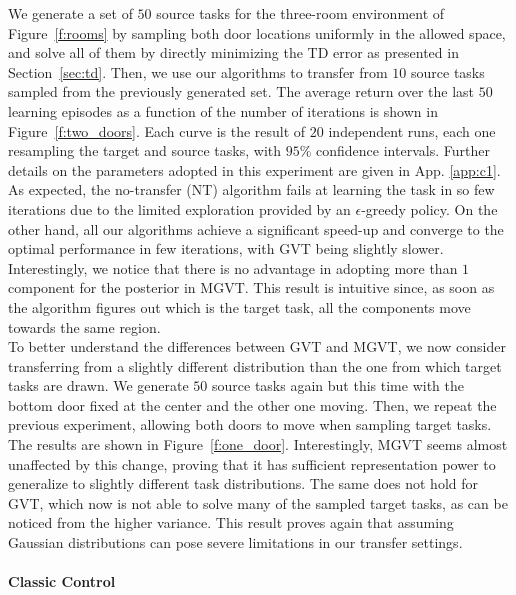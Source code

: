 \documentclass{article}
\begin{document}
We generate a set of $50$ source tasks for the three-room environment of Figure~\ref{f:rooms} by sampling both door locations uniformly in the allowed space, and solve all of them by directly minimizing the TD error as presented in Section~\ref{sec:td}. Then, we use our algorithms to transfer from $10$ source tasks sampled from the previously generated set. The average return over the last $50$ learning episodes as a function of the number of iterations is shown in Figure~\ref{f:two_doors}. Each curve is the result of $20$ independent runs, each one resampling the target and source tasks, with $95\%$ confidence intervals. Further details on the parameters adopted in this experiment are given in App. \ref{app:c1}. As expected, the no-transfer (NT) algorithm fails at learning the task in so few iterations due to the limited exploration provided by an $\epsilon$-greedy policy. On the other hand, all our algorithms achieve a significant speed-up and converge to the optimal performance in few iterations, with GVT being slightly slower. Interestingly, we notice that there is no advantage in adopting more than $1$ component for the posterior in MGVT. This result is intuitive since, as soon as the algorithm figures out which is the target task, all the components move towards the same region.\\
To better understand the differences between GVT and MGVT, we now consider transferring from a slightly different distribution than the one from which target tasks are drawn. We generate $50$ source tasks again but this time with the bottom door fixed at the center and the other one moving. Then, we repeat the previous experiment, allowing both doors to move when sampling target tasks. The results are shown in Figure~\ref{f:one_door}. Interestingly, MGVT seems almost unaffected by this change, proving that it has sufficient representation power to generalize to slightly different task distributions. The same does not hold for GVT, which now is not able to solve many of the sampled target tasks, as can be noticed from the higher variance. This result proves again that assuming Gaussian distributions can pose severe limitations in our transfer settings.

\paragraph{Classic Control} \label{sec:cc}
\end{document}
